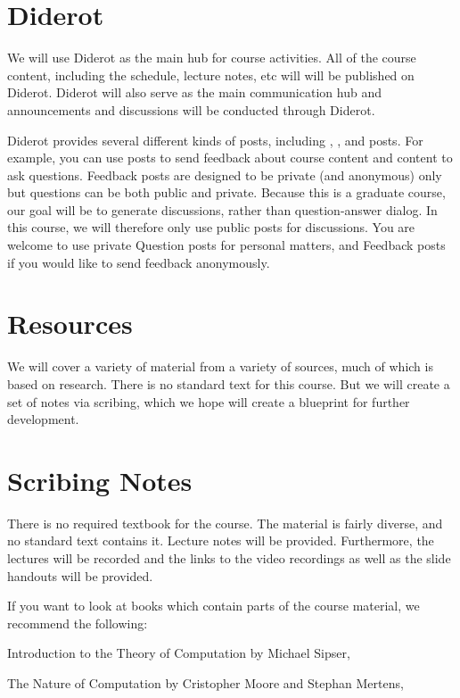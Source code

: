 \section{Diderot}
We will use Diderot as the main hub for course activities.
%
All of the course content, including the schedule, lecture notes, etc will 
will be published on Diderot. 
%
Diderot will also serve as the main communication hub and
announcements and discussions will be conducted through Diderot.
%


Diderot provides several different kinds of posts, including , , and  posts.
%
For example, you can use  posts to send feedback about course content and  content to ask questions.
%
Feedback posts are designed to be private (and anonymous) only but questions can be both public and private.
%
Because this is a graduate course, our goal will be to generate discussions, rather than question-answer dialog.
%
In this course, we will therefore only use public  posts for discussions.
%
You are welcome to use private Question posts for personal matters, and Feedback posts if you would like to send feedback anonymously. 


\section{Resources}

We will cover a variety of material from a variety of sources, much of which is based on research.
%
There is no standard text for this course.
%
But we will create a set of notes via scribing, which we hope will create a blueprint for further development.


\section{Scribing Notes}


There is no required textbook for the course. The material is fairly diverse, and no standard text contains it. Lecture notes will be provided. Furthermore, the lectures will be recorded and the links to the video recordings as well as the slide handouts will be provided.

If you want to look at books which contain parts of the course material, we recommend the following:

Introduction to the Theory of Computation by Michael Sipser,

The Nature of Computation by Cristopher Moore and Stephan Mertens,

